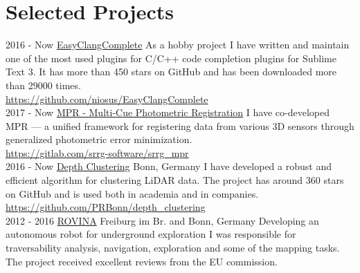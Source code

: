 \documentclass[]{friggeri-cv}
\begin{document}
\section{Selected Projects}
\begin{entrylist}
  \entry
    {2016 - Now}
    {\href{https://github.com/niosus/EasyClangComplete}{EasyClangComplete}}
    {}
    {As a hobby project I have written and maintain one of the most used plugins for C/C++ code completion plugins for Sublime Text 3. It has more than 450 stars on GitHub and has been downloaded more than 29000 times.\\\url{https://github.com/niosus/EasyClangComplete}\\}
  \entry
    {2017 - Now}
    {\href{https://gitlab.com/srrg-software/srrg_mpr}{MPR - Multi-Cue Photometric Registration}}
    {}
    {I have co-developed MPR --- a unified framework for registering data from various 3D sensors through generalized photometric error minimization.\\\url{https://gitlab.com/srrg-software/srrg_mpr}\\}
  \entry
    {2016 - Now}
    {\href{https://github.com/PRBonn/depth_clustering}{Depth Clustering}}
    {Bonn, Germany}
    {I have developed a robust and efficient algorithm for clustering LiDAR data. The project has around 360 stars on GitHub and is used both in academia and in companies.\\\url{https://github.com/PRBonn/depth_clustering}\\}
  \entry
    {2012 - 2016}
    {\href{http://www.rovina-project.eu/}{ROVINA}}
    {Freiburg im Br. and Bonn, Germany}
    {Developing an autonomous robot for underground exploration I was responsible for traversability analysis, navigation, exploration and some of the mapping tasks. The project received excellent reviews from the EU commission.}
\end{entrylist}
\newpage
\end{document}
